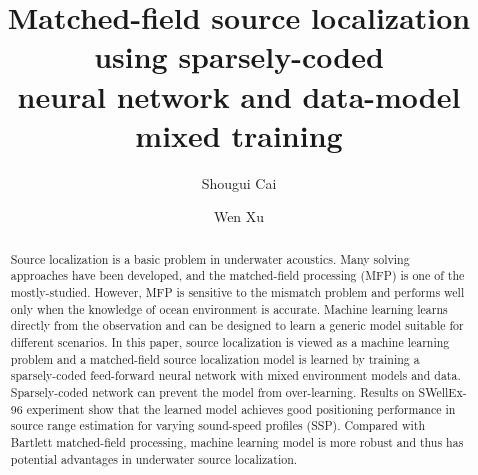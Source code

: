 \documentclass[sigconf]{acmart}
\begin{document}
\title{
Matched-field source localization using sparsely-coded \\neural network and data-model mixed training
}
\author{Shougui Cai}

\author{Wen Xu}

\renewcommand{\shortauthors}{Shougui Cai.}


\begin{abstract}
Source localization is a basic problem in underwater acoustics. Many
solving approaches have been developed, and the matched-field processing
(MFP) is one of the mostly-studied. However, MFP is sensitive to the
mismatch problem and performs well only when the knowledge of ocean
environment is accurate. Machine learning learns directly from the
observation and can be designed to learn a generic model suitable for
different scenarios. In this paper, source localization is viewed as a
machine learning problem and a matched-field source localization model is
learned by training a sparsely-coded feed-forward neural network with mixed
environment models and data. Sparsely-coded network can prevent the model
from over-learning. Results on SWellEx-96 experiment show that the learned
model achieves good positioning performance in source range estimation for
varying sound-speed profiles (SSP). Compared with Bartlett matched-field
processing, machine learning model is more robust and thus has potential
advantages in underwater source localization.
\end{abstract}
\end{document}
